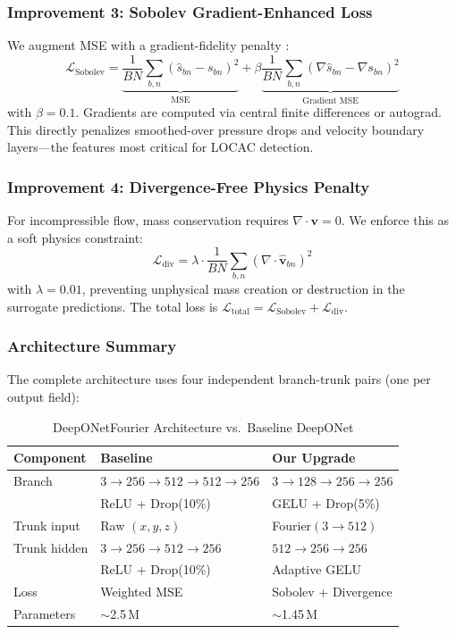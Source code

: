 \documentclass[conference]{IEEEtran}
\begin{document}
\subsubsection{Improvement 3: Sobolev Gradient-Enhanced Loss}
We augment MSE with a gradient-fidelity penalty \cite{son2021sobolev}:
\begin{equation}
\mathcal{L}_\text{Sobolev} = \underbrace{\frac{1}{BN}\sum_{b,n}(\hat{s}_{bn} - s_{bn})^2}_{\text{MSE}} + \beta \underbrace{\frac{1}{BN}\sum_{b,n}(\nabla\hat{s}_{bn} - \nabla s_{bn})^2}_{\text{Gradient MSE}}
\label{eq:sobolev}
\end{equation}
with $\beta = 0.1$. Gradients are computed via central finite differences or autograd. This directly penalizes smoothed-over pressure drops and velocity boundary layers---the features most critical for LOCAC detection.

\subsubsection{Improvement 4: Divergence-Free Physics Penalty}
For incompressible flow, mass conservation requires $\nabla \cdot \bm{v} = 0$. We enforce this as a soft physics constraint:
\begin{equation}
\mathcal{L}_\text{div} = \lambda \cdot \frac{1}{BN}\sum_{b,n}\left(\nabla \cdot \hat{\bm{v}}_{bn}\right)^2
\label{eq:div}
\end{equation}
with $\lambda = 0.01$, preventing unphysical mass creation or destruction in the surrogate predictions. The total loss is $\mathcal{L}_\text{total} = \mathcal{L}_\text{Sobolev} + \mathcal{L}_\text{div}$.

\subsubsection{Architecture Summary}
The complete architecture uses four independent branch-trunk pairs (one per output field):

\begin{table}[htbp]
\caption{DeepONetFourier Architecture vs.\ Baseline DeepONet}
\label{tab:arch}
\centering
\begin{tabular}{lll}
\toprule
\textbf{Component} & \textbf{Baseline} & \textbf{Our Upgrade} \\
\midrule
Branch & $3{\to}256{\to}512{\to}512{\to}256$ & $3{\to}128{\to}256{\to}256$ \\
 & ReLU + Drop(10\%) & GELU + Drop(5\%) \\
\midrule
Trunk input & Raw $(x,y,z)$ & Fourier$(3{\to}512)$ \\
Trunk hidden & $3{\to}256{\to}512{\to}256$ & $512{\to}256{\to}256$ \\
 & ReLU + Drop(10\%) & Adaptive GELU \\
\midrule
Loss & Weighted MSE & Sobolev + Divergence \\
Parameters & $\sim$2.5\,M & $\sim$1.45\,M \\
\bottomrule
\end{tabular}
\end{table}
\end{document}
